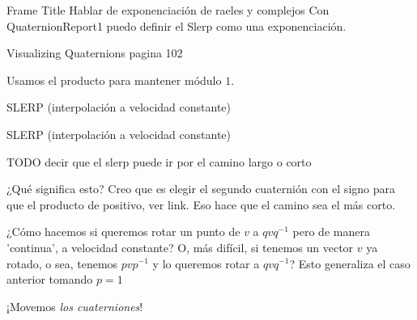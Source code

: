 \documentclass[10pt]{beamer}
\def\m{^{-1}}
\begin{document}
\fi

\iffalse
\begin{frame}{Frame Title}
    Hablar de exponenciación de raeles y complejos
    Con QuaternionReport1 puedo definir el Slerp como una exponenciación.
    
    Visualizing Quaternions pagina 102
    
    Usamos el producto para mantener módulo $1$.
\end{frame}



\begin{frame}{SLERP (interpolación a velocidad constante)}

\end{frame}

\begin{frame}{SLERP (interpolación a velocidad constante)}

\Huge{TODO decir que el slerp puede ir por el camino largo o corto} %


¿Qué significa esto? Creo que es elegir el segundo cuaternión con el signo para que el producto de positivo, ver link. Eso hace que el camino sea el más corto.


¿Cómo hacemos si queremos rotar un punto de $v$ a $qvq\m$ pero de manera 'continua', a velocidad constante? O, más difícil, si tenemos un vector $v$ ya rotado, o sea, tenemos $p v p\m$ y lo queremos rotar a $q v q\m$? Esto generaliza el caso anterior tomando $p = 1$ \pause

¡Movemos \textit{los cuaterniones}!







\end{frame}
\end{document}
